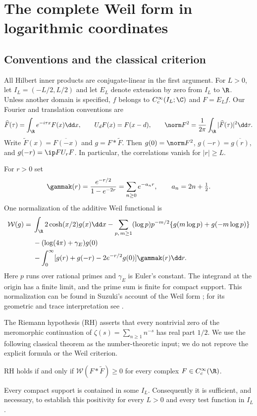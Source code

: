 \section{The complete Weil form in logarithmic coordinates}\label{sec:weil}
\subsection{Conventions and the classical criterion}
All Hilbert inner products are conjugate-linear in the first argument.
For $L>0$, let $I_L=(-L/2,L/2)$ and let $E_L$ denote extension by zero
from $I_L$ to $\R$. Unless another domain is specified, $f$ belongs to
$C_c^\infty(I_L;\C)$ and $F=E_Lf$. Our Fourier and translation
conventions are
\begin{equation}\label{eq:fourier}
 \widehat F(\tau)=\int_\R e^{-i\tau x}F(x)\dd x,
 \qquad U_dF(x)=F(x-d),\qquad
 \norm F^2=\frac1{2\pi}\int_\R|\widehat F(\tau)|^2\dd\tau.
\end{equation}
Write $\widetilde F(x)=\overline{F(-x)}$ and $g=F*\widetilde F$.
Then $g(0)=\norm F^2$, $g(-r)=\overline{g(r)}$, and
$g(-r)=\ip F{U_rF}$. In particular, the correlations vanish for $|r|\geq L$.

For $r>0$ set
\begin{equation}\label{eq:gamma-kernel}
 \gammak(r)=\frac{e^{-r/2}}{1-e^{-2r}}
 =\sum_{n\geq0}e^{-a_nr},\qquad a_n=2n+\tfrac12.
\end{equation}
One normalization of the additive Weil functional is
\begin{align}
 \mathcal W(g)={}&\int_\R 2\cosh(x/2)g(x)\dd x
 -\sum_{p,\,m\geq1}(\log p)p^{-m/2}
       \{g(m\log p)+g(-m\log p)\}\notag\\
 &-(\log(4\pi)+\gamma_E)g(0)\notag\\
 &-\int_0^\infty
       [g(r)+g(-r)-2e^{-r/2}g(0)]\gammak(r)\dd r.
 \label{eq:weil-functional}
\end{align}
Here $p$ runs over rational primes and $\gamma_E$ is Euler's constant.
The integrand at the origin has a finite limit, and the prime sum is
finite for compact support. This normalization can be found in
Suzuki's account of the Weil form \cite[Section 1.1]{Suzuki}; for its
geometric and trace interpretation see \cite{CCM}.

The Riemann hypothesis (RH) asserts that every nontrivial zero of the
meromorphic continuation of $\zeta(s)=\sum_{n\geq1}n^{-s}$ has real
part $1/2$. We use the following classical theorem as the number-theoretic
input; we do not reprove the explicit formula or the Weil criterion.
\begin{theorem}\label{thm:weil}
RH holds if and only if $\mathcal W(F*\widetilde F)\geq0$ for every
complex $F\in C_c^\infty(\R)$.
\end{theorem}
Every compact support is contained in some $I_L$. Consequently it is
sufficient, and necessary, to establish this positivity for every $L>0$
and every test function in $I_L$.

